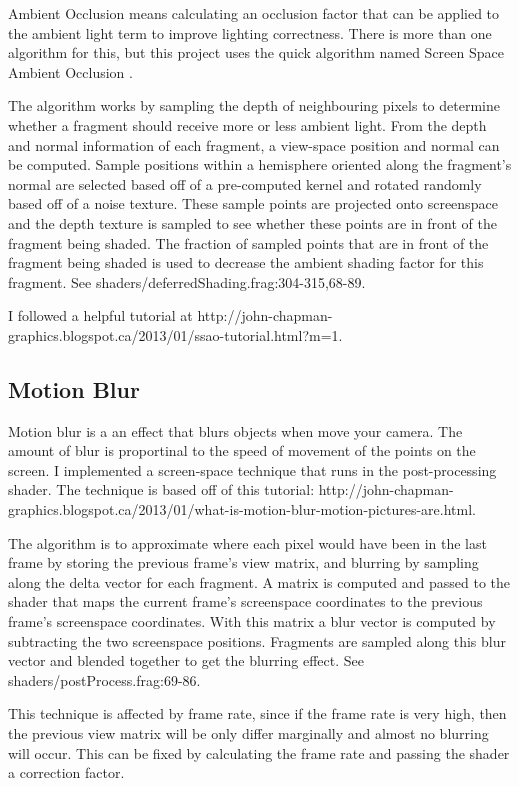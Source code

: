 \documentclass{book}
\begin{document}
      Ambient Occlusion means calculating an occlusion factor that can be applied to the ambient light term to improve lighting correctness. There is more than one algorithm for this, but this project uses the quick algorithm named Screen Space Ambient Occlusion \cite{kajalinshaderx7}\cite{mittring2007finding}.

      The algorithm works by sampling the depth of neighbouring pixels to determine whether a fragment should receive more or less ambient light. From the depth and normal information of each fragment, a view-space position and normal can be computed. Sample positions within a hemisphere oriented along the fragment's normal are selected based off of a pre-computed kernel and rotated randomly based off of a noise texture. These sample points are projected onto screenspace and the depth texture is sampled to see whether these points are in front of the fragment being shaded. The fraction of sampled points that are in front of the fragment being shaded is used to decrease the ambient shading factor for this fragment. See shaders/deferredShading.frag:304-315,68-89.

      I followed a helpful tutorial at http://john-chapman-graphics.blogspot.ca/2013/01/ssao-tutorial.html?m=1.


    \subsection{Motion Blur} \label{motion-blur}
      Motion blur is a an effect that blurs objects when move your camera. The amount of blur is proportinal to the speed of movement of the points on the screen.
      I implemented a screen-space technique that runs in the post-processing shader. The technique is based off of this tutorial: http://john-chapman-graphics.blogspot.ca/2013/01/what-is-motion-blur-motion-pictures-are.html.

      The algorithm is to approximate where each pixel would have been in the last frame by storing the previous frame's view matrix, and blurring by sampling along the delta vector for each fragment. A matrix is computed and passed to the shader that maps the current frame's screenspace coordinates to the previous frame's screenspace coordinates. With this matrix a blur vector is computed by subtracting the two screenspace positions. Fragments are sampled along this blur vector and blended together to get the blurring effect. See shaders/postProcess.frag:69-86.

      This technique is affected by frame rate, since if the frame rate is very high, then the previous view matrix will be only differ marginally and almost no blurring will occur. This can be fixed by calculating the frame rate and passing the shader a correction factor.
\end{document}
